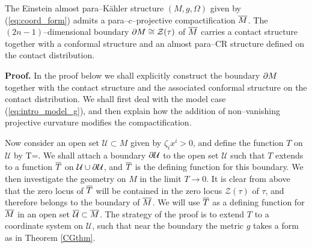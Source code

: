 


\begin{theo}
\label{our_thm}
The Einstein almost para--K\"ahler structure $(M, g, \Omega)$ given by 
(\ref{eq:coord_form}) admits a para--$c$--projective compactification
$\overline{M}$. The
$(2n-1)$--dimensional boundary $\partial M\cong \mathcal{Z}(\tau)$ of $\overline{M}$ carries a contact structure together with a conformal structure 
and an almost para--CR structure
defined on the contact distribution.
\end{theo}
\noindent
{\bf Proof.}
In the proof below we shall explicitly construct the boundary $\partial M$ together with the contact structure and the associated conformal structure on the contact distribution. We shall
first deal with the model case (\ref{eq:intro_model_g}), and then explain how the addition of non--vanishing projective curvature modifies the compactification.

Now consider an open set  ${\mathcal U}\subset M$ given
by  $\zeta_ix^i>0$, and define the function $T$ on ${\mathcal U}$ by
\be
\label{formula_for_T}
T=.
\ee
We shall attach a boundary  $\partial \mathcal{U}$ to the open set $\mathcal{U}$ 
such that $T$ extends to a function $\overline{T}$ on $\mathcal{U}\cup \partial \mathcal{U}$, and
$\overline{T}$ is  the defining function for this boundary.
We then investigate the geometry on $M$ in the limit $T\rightarrow 0$.
It is clear from above that
the zero locus of $\overline{T}$ will be contained in the zero locus $\mathcal{Z}(\tau)$ of $\tau$, and
therefore belongs to the boundary of $\overline{M}$. We will 
use $\overline{T}$ as a defining function for $\overline{M}$ in an open set $\overline{\mathcal{U}}\subset\overline{M}$.
The strategy of the proof is to extend $T$ to a coordinate system on 
$\mathcal{U}$, such that near the boundary the metric $g$ takes a form
as in Theorem \ref{CGthm}.


